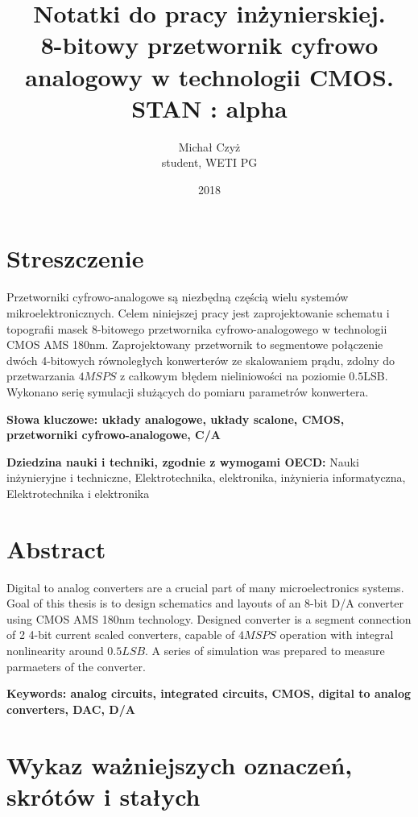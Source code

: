 \documentclass[10pt,a4paper,twoside]{report}
\title{Notatki do pracy inżynierskiej. \\ 8-bitowy przetwornik cyfrowo analogowy w technologii CMOS. \\ STAN : alpha}
\date{2018}
\author{Michał Czyż \\ student, WETI PG}
\theoremstyle{definition}
\theoremstyle{definition}
\theoremstyle{definition}
\theoremstyle{definition}
\theoremstyle{definition}
\begin{document}
	\setcounter{page}{3}
	\section*{Streszczenie}
	{	Przetworniki cyfrowo-analogowe są niezbędną częścią wielu systemów mikroelektronicznych. Celem niniejszej pracy jest zaprojektowanie schematu i topografii masek 8-bitowego przetwornika cyfrowo-analogowego w technologii CMOS AMS 180nm. Zaprojektowany przetwornik to segmentowe połączenie dwóch 4-bitowych równoległych konwerterów ze skalowaniem prądu, zdolny do przetwarzania $4MSPS$ z całkowym błędem nieliniowości na poziomie $0.5$LSB. Wykonano serię symulacji służących do pomiaru parametrów konwertera.}
	
	{	\textbf{Słowa kluczowe: układy analogowe, układy scalone, CMOS, przetworniki cyfrowo-analogowe, C/A }}
	
	{	\textbf{Dziedzina nauki i techniki, zgodnie z wymogami OECD:} Nauki inżynieryjne i techniczne,  Elektrotechnika, elektronika, inżynieria informatyczna,  Elektrotechnika i elektronika}
	
	\newpage
	
	\section*{Abstract}
	{	Digital to analog converters are a crucial part of many microelectronics systems. Goal of this thesis is to design schematics and layouts of an 8-bit D/A converter using CMOS AMS 180nm technology. Designed converter is a segment connection of 2 4-bit current scaled converters, capable of $4MSPS$ operation with integral nonlinearity around $0.5LSB$. A series of simulation was prepared to measure parmaeters of the converter.}
	
	{	\textbf{Keywords: analog circuits, integrated circuits, CMOS, digital to analog converters, DAC, D/A}}
	
	{
	\tableofcontents
	\par
	}
	\newpage


	\section*{Wykaz ważniejszych oznaczeń, skrótów i stałych}
	\label{sec:skroty}
\end{document}
